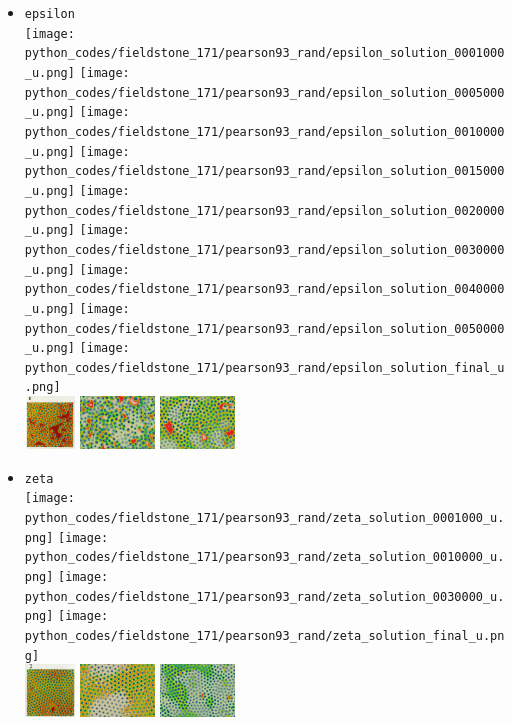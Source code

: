 \begin{itemize}
\item {\tt epsilon}\\
\texttt{[image: python\_codes/fieldstone\_171/pearson93\_rand/epsilon\_solution\_0001000\_u.png]}
\texttt{[image: python\_codes/fieldstone\_171/pearson93\_rand/epsilon\_solution\_0005000\_u.png]}
\texttt{[image: python\_codes/fieldstone\_171/pearson93\_rand/epsilon\_solution\_0010000\_u.png]}
\texttt{[image: python\_codes/fieldstone\_171/pearson93\_rand/epsilon\_solution\_0015000\_u.png]}
\texttt{[image: python\_codes/fieldstone\_171/pearson93\_rand/epsilon\_solution\_0020000\_u.png]}
\texttt{[image: python\_codes/fieldstone\_171/pearson93\_rand/epsilon\_solution\_0030000\_u.png]}
\texttt{[image: python\_codes/fieldstone\_171/pearson93\_rand/epsilon\_solution\_0040000\_u.png]}
\texttt{[image: python\_codes/fieldstone\_171/pearson93\_rand/epsilon\_solution\_0050000\_u.png]}
\texttt{[image: python\_codes/fieldstone\_171/pearson93\_rand/epsilon\_solution\_final\_u.png]}\\
\includegraphics[height=1.4cm]{python_codes/fieldstone_171/images/pear93_epsilon}
\includegraphics[height=1.4cm]{python_codes/fieldstone_171/images/munafo_epsilon1}
\includegraphics[height=1.4cm]{python_codes/fieldstone_171/images/munafo_epsilon2}

\item {\tt zeta}\\
\texttt{[image: python\_codes/fieldstone\_171/pearson93\_rand/zeta\_solution\_0001000\_u.png]}
\texttt{[image: python\_codes/fieldstone\_171/pearson93\_rand/zeta\_solution\_0010000\_u.png]}
\texttt{[image: python\_codes/fieldstone\_171/pearson93\_rand/zeta\_solution\_0030000\_u.png]}
\texttt{[image: python\_codes/fieldstone\_171/pearson93\_rand/zeta\_solution\_final\_u.png]}\\
\includegraphics[height=1.4cm]{python_codes/fieldstone_171/images/pear93_zeta}
\includegraphics[height=1.4cm]{python_codes/fieldstone_171/images/munafo_zeta1}
\includegraphics[height=1.4cm]{python_codes/fieldstone_171/images/munafo_zeta2}





\end{itemize}
